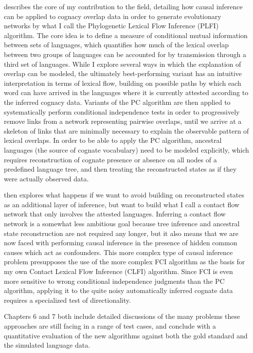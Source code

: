  describes the core of my contribution to the field, detailing how causal inference can be applied to cognacy overlap data in order to generate evolutionary networks by what I call the Phylogenetic Lexical Flow Inference (PLFI) algorithm. The core idea is to define a measure of conditional mutual information between sets of languages, which quantifies how much of the lexical overlap between two groups of languages can be accounted for by transmission through a third set of languages. While I explore several ways in which the explanation of overlap can be modeled, the ultimately best-performing variant has an intuitive interpretation in terms of lexical flow, building on possible paths by which each word can have arrived in the languages where it is currently attested according to the inferred cognacy data. Variants of the PC algorithm are then applied to systematically perform conditional independence tests in order to progressively remove links from a network representing pairwise overlaps, until we arrive at a skeleton of links that are minimally necessary to explain the observable pattern of lexical overlaps. In order to be able to apply the PC algorithm, ancestral languages (the source of cognate vocabulary) need to be modeled explicitly, which requires reconstruction of cognate presence or absence on all nodes of a predefined language tree, and then treating the reconstructed states as if they were actually observed data.

 then explores what happens if we want to avoid building on reconstructed states as an additional layer of inference, but want to build what I call a contact flow network that only involves the attested languages. Inferring a contact flow network is a somewhat less ambitious goal because tree inference and ancestral state reconstruction are not required any longer, but it also means that we are now faced with performing causal inference in the presence of hidden common causes which act as confounders. This more complex type of causal inference problem presupposes the use of the more complex FCI algorithm as the basis for my own Contact Lexical Flow Inference (CLFI) algorithm. Since FCI is even more sensitive to wrong conditional independence judgments than the PC algorithm, applying it to the quite noisy automatically inferred cognate data requires a specialized test of directionality.

Chapters 6 and 7 both include detailed discussions of the many problems these approaches are still facing in a range of test cases, and conclude with a quantitative evaluation of the new algorithms against both the gold standard and the simulated language data.

